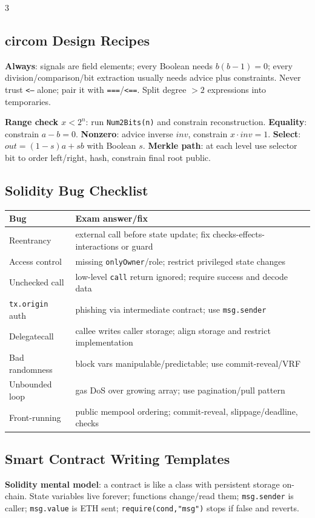 \documentclass[8pt]{extarticle}
\newcommand{\term}[1]{\textbf{#1}}
\begin{document}
\begin{multicols*}{3}
\subsection{circom Design Recipes}
\term{Always}: signals are field elements; every Boolean needs $b(b-1)=0$; every division/comparison/bit extraction usually needs advice plus constraints. Never trust \texttt{<--} alone; pair it with \texttt{===}/\texttt{<==}. Split degree $>2$ expressions into temporaries.

\term{Range check $x<2^n$}: run \texttt{Num2Bits(n)} and constrain reconstruction. \term{Equality}: constrain $a-b=0$. \term{Nonzero}: advice inverse $inv$, constrain $x\cdot inv=1$. \term{Select}: $out=(1-s)a+sb$ with Boolean $s$. \term{Merkle path}: at each level use selector bit to order left/right, hash, constrain final root public.

\subsection{Solidity Bug Checklist}
\begin{tabularx}{\linewidth}{@{}lX@{}}
\toprule
Bug & Exam answer/fix\\
\midrule
Reentrancy & external call before state update; fix checks-effects-interactions or guard\\
Access control & missing \texttt{onlyOwner}/role; restrict privileged state changes\\
Unchecked call & low-level \texttt{call} return ignored; require success and decode data\\
\texttt{tx.origin} auth & phishing via intermediate contract; use \texttt{msg.sender}\\
Delegatecall & callee writes caller storage; align storage and restrict implementation\\
Bad randomness & block vars manipulable/predictable; use commit-reveal/VRF\\
Unbounded loop & gas DoS over growing array; use pagination/pull pattern\\
Front-running & public mempool ordering; commit-reveal, slippage/deadline, checks\\
\bottomrule
\end{tabularx}

\subsection{Smart Contract Writing Templates}
\term{Solidity mental model}: a contract is like a class with persistent storage on-chain. State variables live forever; functions change/read them; \texttt{msg.sender} is caller; \texttt{msg.value} is ETH sent; \texttt{require(cond,"msg")} stops if false and reverts.


\end{multicols*}
\end{document}
